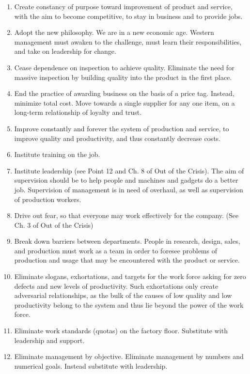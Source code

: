 \documentclass[
]{book}
\begin{document}
\begin{enumerate}
\def\labelenumi{\arabic{enumi}.}
\item
  Create constancy of purpose toward improvement of product and service, with the aim to become competitive, to stay in business and to provide jobs.
\item
  Adopt the new philosophy. We are in a new economic age. Western management must awaken to the challenge, must learn their responsibilities, and take on leadership for change.
\item
  Cease dependence on inspection to achieve quality. Eliminate the need for massive inspection by building quality into the product in the first place.
\item
  End the practice of awarding business on the basis of a price tag. Instead, minimize total cost. Move towards a single supplier for any one item, on a long-term relationship of loyalty and trust.
\item
  Improve constantly and forever the system of production and service, to improve quality and productivity, and thus constantly decrease costs.
\item
  Institute training on the job.
\item
  Institute leadership (see Point 12 and Ch. 8 of Out of the Crisis). The aim of supervision should be to help people and machines and gadgets do a better job. Supervision of management is in need of overhaul, as well as supervision of production workers.
\item
  Drive out fear, so that everyone may work effectively for the company. (See Ch. 3 of Out of the Crisis)
\item
  Break down barriers between departments. People in research, design, sales, and production must work as a team in order to foresee problems of production and usage that may be encountered with the product or service.
\item
  Eliminate slogans, exhortations, and targets for the work force asking for zero defects and new levels of productivity. Such exhortations only create adversarial relationships, as the bulk of the causes of low quality and low productivity belong to the system and thus lie beyond the power of the work force.
\item
  Eliminate work standards (quotas) on the factory floor. Substitute with leadership and support.
\item
  Eliminate management by objective. Eliminate management by numbers and numerical goals. Instead substitute with leadership.

\end{enumerate}
\end{document}
